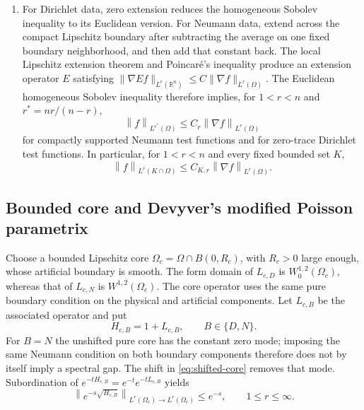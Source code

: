 \documentclass[12pt]{amsart}
\newcommand{\norm}[2]{\left\lVert #1\right\rVert_{#2}}
\theoremstyle{remark}
\begin{document}
\begin{enumerate}[label=\textup{(\roman*)},leftmargin=*]
On a bounded strongly Lipschitz domain $U$, the same theorem and the
bounded functional calculus yield
\begin{equation}\label{eq:core-reverse}
 \norm{(1+L_{U,B})^{1/2}v}{L^r(U)}
 \leq C_r\bigl(\norm v{L^r(U)}+\norm{\nabla v}{L^r(U)}\bigr).
\end{equation}
Here the pure boundary condition $B$ is imposed on all of $\partial U$.
\item For Dirichlet data, zero extension reduces the homogeneous Sobolev
inequality to its Euclidean version.  For Neumann data, extend across the
compact Lipschitz boundary after subtracting the average on one fixed
boundary neighborhood, and then add that constant back.  The local
Lipschitz extension theorem \cite[Chapter~VI, \S3, Theorem~5,
p.~181]{SteinSingular70} and Poincar\'e's inequality produce an extension operator \(E\) satisfying
\(\|\nabla Ef\|_{L^r(\mathbb R^n)}\leq C\|\nabla f\|_{L^r(\Omega)}\).
The Euclidean homogeneous Sobolev inequality therefore implies, for
$1<r<n$ and $r^*=nr/(n-r)$,
\begin{equation}\label{eq:exterior-Sobolev}
 \norm f{L^{r^*}(\Omega)}\leq C_r\norm{\nabla f}{L^r(\Omega)}
\end{equation}
for compactly supported Neumann test functions and for zero-trace
Dirichlet test functions.  In particular, for $1<r<n$ and every fixed
bounded set $K$,
\begin{equation}\label{eq:exterior-local-Poincare}
 \norm f{L^r(K\cap\Omega)}\leq C_{K,r}\norm{\nabla f}{L^r(\Omega)}.
\end{equation}
\end{enumerate}

\subsection{Bounded core and Devyver's modified Poisson parametrix}

Choose a bounded Lipschitz core
$\Omega_c=\Omega\cap B(0,R_c)$, with $R_c>0$ large enough, whose
artificial boundary is smooth.  The form domain of $L_{c,D}$ is
$W_0^{1,2}(\Omega_c)$, whereas that of $L_{c,N}$ is
$W^{1,2}(\Omega_c)$.  The core operator uses the same pure boundary
condition on the physical and artificial components.
Let $L_{c,B}$ be the associated operator and put
\begin{equation}\label{eq:shifted-core}
 H_{c,B}=1+L_{c,B},\qquad B\in\{D,N\}.
\end{equation}
For $B=N$ the unshifted pure core has the constant zero mode; imposing the
same Neumann condition on both boundary components therefore does not by
itself imply a spectral gap.  The shift in \eqref{eq:shifted-core} removes
that mode.  Subordination of
$e^{-tH_{c,B}}=e^{-t}e^{-tL_{c,B}}$ yields
\[
 \norm{e^{-s\sqrt{H_{c,B}}}}{L^r(\Omega_c)\to L^r(\Omega_c)}
 \leq e^{-s},\qquad 1\leq r\leq\infty.
\]
\end{document}
